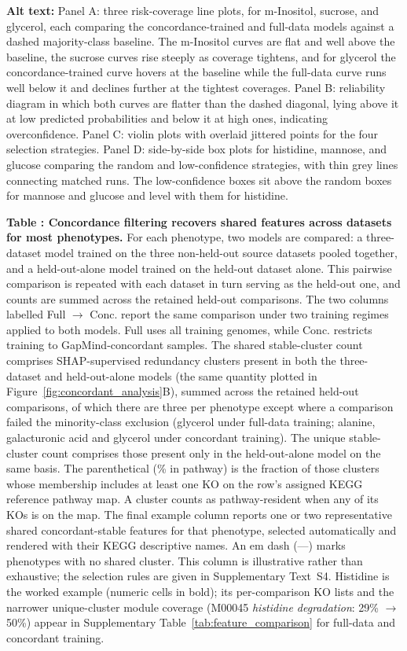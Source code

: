 \noindent\textbf{Alt text:} Panel A: three risk-coverage line plots, for m-Inositol, sucrose, and glycerol, each comparing the concordance-trained and full-data models against a dashed majority-class baseline. The m-Inositol curves are flat and well above the baseline, the sucrose curves rise steeply as coverage tightens, and for glycerol the concordance-trained curve hovers at the baseline while the full-data curve runs well below it and declines further at the tightest coverages. Panel B: reliability diagram in which both curves are flatter than the dashed diagonal, lying above it at low predicted probabilities and below it at high ones, indicating overconfidence. Panel C: violin plots with overlaid jittered points for the four selection strategies. Panel D: side-by-side box plots for histidine, mannose, and glucose comparing the random and low-confidence strategies, with thin grey lines connecting matched runs. The low-confidence boxes sit above the random boxes for mannose and glucose and level with them for histidine.
\par\medskip

\label{tab:main_feature_comparison}%
\noindent\textbf{Table : Concordance filtering recovers shared features across datasets for most phenotypes.}
For each phenotype, two models are compared: a three-dataset model trained on the three non-held-out source datasets pooled together, and a held-out-alone model trained on the held-out dataset alone.
This pairwise comparison is repeated with each dataset in turn serving as the held-out one, and counts are summed across the retained held-out comparisons.
The two columns labelled Full $\rightarrow$ Conc. report the same comparison under two training regimes applied to both models.
Full uses all training genomes, while Conc. restricts training to GapMind-concordant samples.
The shared stable-cluster count comprises SHAP-supervised redundancy clusters present in both the three-dataset and held-out-alone models (the same quantity plotted in Figure~\ref{fig:concordant_analysis}B), summed across the retained held-out comparisons, of which there are three per phenotype except where a comparison failed the minority-class exclusion (glycerol under full-data training; alanine, galacturonic acid and glycerol under concordant training).
The unique stable-cluster count comprises those present only in the held-out-alone model on the same basis.
The parenthetical (\% in pathway) is the fraction of those clusters whose membership includes at least one KO on the row's assigned KEGG reference pathway map.
A cluster counts as pathway-resident when any of its KOs is on the map.
The final example column reports one or two representative shared concordant-stable features for that phenotype, selected automatically and rendered with their KEGG descriptive names.
An em dash (---) marks phenotypes with no shared cluster.
This column is illustrative rather than exhaustive; the selection rules are given in Supplementary Text~S4.
Histidine is the worked example (numeric cells in bold); its per-comparison KO lists and the narrower unique-cluster module coverage (M00045 \textit{histidine degradation}: 29\% $\rightarrow$ 50\%) appear in Supplementary Table~\ref{tab:feature_comparison} for full-data and concordant training.

